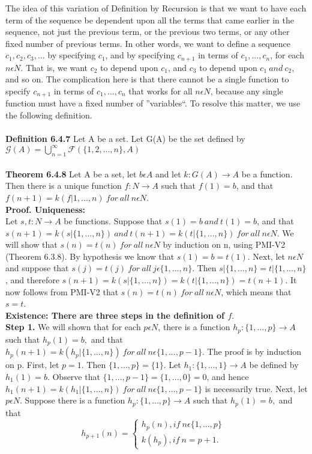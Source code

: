 \documentclass[a4paper,10pt]{report}
\begin{document}
    The idea of this variation of Definition by Recursion is that we want to have each term of the sequence be dependent upon all the 
terms that came earlier in the sequence, not just the previous term, or the previous two terms, or any other fixed number of previous terms. In other words, we want to define a sequence $c_1, c_2, c_3, . . .$ by specifying $c_1$, and by specifying $c_{n+1}$ in terms of $c_1, . . ., c_n$, for each $n\epsilon N$. That is, we want $c_2$ to depend upon $c_1$, and $c_3$ to depend upon $c_1~ and~ c_2$, and so on. The complication here is that there cannot be a single function to specify $c_{n+1}$ in terms of $c_1, . . ., c_n$ that works for all $n\epsilon N$, because any single function must have a fixed number of ''variables``. To resolve this matter, we use the following definition.
\\\\
{\bf Definition 6.4.7} Let A be a set. Let G(A) be the set defined by\\
$\mathscr{G}(A)=\bigcup_{n=1}^{\infty}\mathscr{F}(\{1, 2, . . ., n\}, A)$\\\\
{\bf Theorem 6.4.8} Let A be a set, let $b\epsilon A$ and let $k : G(A)\rightarrow A$ be a function. Then there is a unique function 
$f : N\rightarrow A$ such that $f(1)=b$, and that $f (n + 1) = k( f|{1,...,n} )~ for~ all~ n\epsilon N$.
\\
{\bf Proof. Uniqueness:}\\
Let $s,t : N\rightarrow A$ be functions. Suppose that $s(1) = b~ and~ t(1) = b$, and that $s(n + 1) = k(s|\{1,...,n\})~ and~ t(n + 1) = k(t|\{1,...,n\})~ for~ all~ n\epsilon N$. We will show that $s(n)=t(n)~for~all~n\epsilon N$ by induction on n, using PMI-V2 (Theorem 6.3.8). By hypothesis we know that $s(1) = b = t(1)$. Next, let $n\epsilon N$ and suppose that $s(j) = t(j)~ for~ all~ j\epsilon \{1,. . ., n\}$. Then $s|\{1,...,n\} = t|\{1,...,n\}$, and therefore $s(n + 1) = k(s|\{1,...,n\} ) = k(t|\{1,...,n\}) = t(n + 1)$. It now follows from PMI-V2 that $s(n) = t(n)~ for ~all~ n\epsilon N$, which means that $s = t$. \\{\bf Existence: There are three steps in the definition of $f .$}\\
{\bf Step 1.} We will shown that for each $p\epsilon N$, there is a function $h_p : \{1, . . ., p\}\rightarrow A$ such that $h_p(1)=b,$ and that $h_p(n + 1) = k(h_p |\{1,...,n\})~ for~ all~ n\epsilon \{1, . . ., p − 1\}$. The proof is by induction on p. First, let $p=1.$ Then $\{1, . . ., p\} = \{1\}$. Let $h_1 : \{1, . . .,1\}\rightarrow A$ be defined by $h_1(1) = b$. Observe that $\{1, . . ., p − 1\} = \{1, . . ., 0\} = 0$, and hence $h_1 (n + 1) = k(h_1 |\{1, . . ., n\})~ for~ all~ n\epsilon \{1, . . ., p − 1\}$ is necessarily true. Next, let $p\epsilon N$. Suppose there is a function $h_p : \{1, . . ., p\}\rightarrow A$ such that $h_p(1) = b,$ and that  \begin{equation*}
h_{p+1}(n)= \left\{\begin{matrix}
h_p(n), if~ n\epsilon \{1, . . ., p\} & \\ 
k(h_p), if~ n=p+1.& 
\end{matrix}\right.
\end{equation*}
\end{document}
